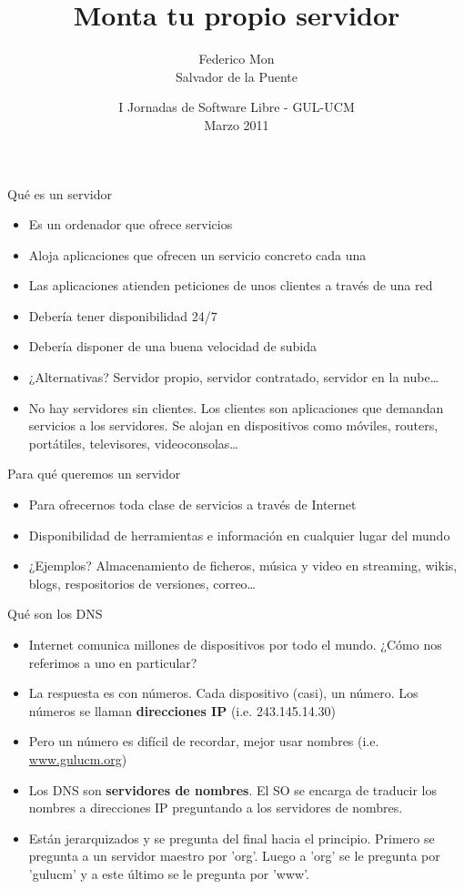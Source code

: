 \documentclass[spanish]{beamer}
\title[Monta tu propio servidor - GUL-UCM]
{Monta tu propio servidor
}
\author[\url{http://gulucm.org}]
{
Federico Mon\\
Salvador de la Puente
}
\institute{Facultad de Informática.\\Universidad Complutense de Madrid.}
\date{
I Jornadas de Software Libre - GUL-UCM\\
Marzo 2011}
\begin{document}
\frame{\titlepage}

\begin{frame}{Qué es un servidor}
\begin{itemize}
\item Es un ordenador que ofrece servicios
\item Aloja aplicaciones que ofrecen un servicio concreto cada una
\item Las aplicaciones atienden peticiones de unos clientes a través de una red
\item Debería tener disponibilidad 24/7
\item Debería disponer de una buena velocidad de subida
\item ¿Alternativas? Servidor propio, servidor contratado, servidor en la nube\ldots
\item No hay servidores sin clientes. Los clientes son aplicaciones que demandan servicios a los servidores. Se alojan en dispositivos como móviles, routers, portátiles, televisores, videoconsolas\ldots
\end{itemize}
\end{frame}

\begin{frame}{Para qué queremos un servidor}
\begin{itemize}
\item Para ofrecernos toda clase de servicios a través de Internet
\item Disponibilidad de herramientas e información en cualquier lugar del mundo
\item ¿Ejemplos? Almacenamiento de ficheros, música y video en streaming, wikis, blogs, respositorios de versiones, correo\ldots
\end{itemize}
\end{frame}

\begin{frame}{Qué son los DNS}
\begin{itemize}
\item Internet comunica millones de dispositivos por todo el mundo. ¿Cómo nos referimos a uno en particular?
\item La respuesta es con números. Cada dispositivo (casi), un número. Los números se llaman {\bf direcciones IP} (i.e. 243.145.14.30)
\item Pero un número es difícil de recordar, mejor usar nombres (i.e. \url{www.gulucm.org})
\item Los DNS son {\bf servidores de nombres}. El SO se encarga de traducir los nombres a direcciones IP preguntando a los servidores de nombres.
\item Están jerarquizados y se pregunta del final hacia el principio. Primero se pregunta a un servidor maestro por 'org'. Luego a 'org' se le pregunta por 'gulucm' y a este último se le pregunta por 'www'.
\end{itemize}
\end{frame}
\end{document}
